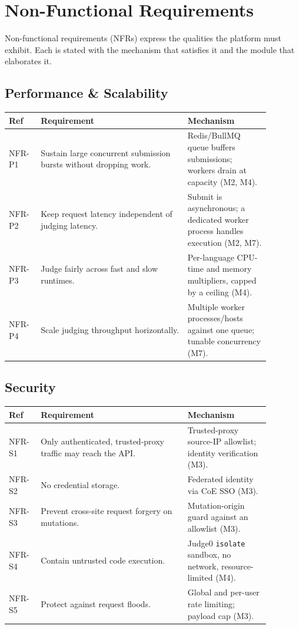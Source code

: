 \documentclass[12pt,a4paper,oneside]{report}
\newcommand{\code}[1]{\texttt{#1}}
\begin{document}
\chapter{Non-Functional Requirements}
Non-functional requirements (NFRs) express the qualities the platform must
exhibit. Each is stated with the mechanism that satisfies it and the module that
elaborates it.

\section{Performance \& Scalability}
\begin{longtable}{@{}p{0.10\linewidth} p{0.50\linewidth} p{0.28\linewidth}@{}}
\toprule
\textbf{Ref} & \textbf{Requirement} & \textbf{Mechanism}\\
\midrule
\endhead
NFR-P1 & Sustain large concurrent submission bursts without dropping work. & Redis/BullMQ queue buffers submissions; workers drain at capacity (M2, M4).\\
NFR-P2 & Keep request latency independent of judging latency. & Submit is asynchronous; a dedicated worker process handles execution (M2, M7).\\
NFR-P3 & Judge fairly across fast and slow runtimes. & Per-language CPU-time and memory multipliers, capped by a ceiling (M4).\\
NFR-P4 & Scale judging throughput horizontally. & Multiple worker processes/hosts against one queue; tunable concurrency (M7).\\
\bottomrule
\end{longtable}

\section{Security}
\begin{longtable}{@{}p{0.10\linewidth} p{0.50\linewidth} p{0.28\linewidth}@{}}
\toprule
\textbf{Ref} & \textbf{Requirement} & \textbf{Mechanism}\\
\midrule
\endhead
NFR-S1 & Only authenticated, trusted-proxy traffic may reach the API. & Trusted-proxy source-IP allowlist; identity verification (M3).\\
NFR-S2 & No credential storage. & Federated identity via CoE SSO (M3).\\
NFR-S3 & Prevent cross-site request forgery on mutations. & Mutation-origin guard against an allowlist (M3).\\
NFR-S4 & Contain untrusted code execution. & Judge0 \code{isolate} sandbox, no network, resource-limited (M4).\\
NFR-S5 & Protect against request floods. & Global and per-user rate limiting; payload cap (M3).\\
\bottomrule
\end{longtable}
\end{document}
